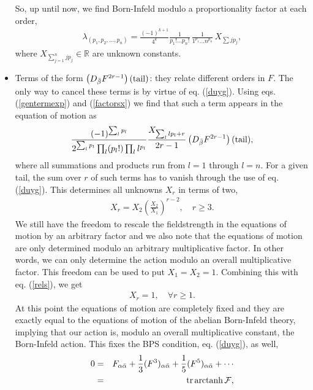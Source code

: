 \documentclass[a4paper,12pt,oneside]{article}
\def\IR{\mathbb{R}}
\newcommand{\tail}{\mbox{$({\rm tail})$}}
\begin{document}
\begin{itemize}
So, up until now, we find Born-Infeld modulo a proportionality factor at each order,
\begin{eqnarray}
\label{factorsx}
\lambda_{(p_1,p_2,\ldots,p_n)}=\frac{(-1)^{k+1}}{4^k} \frac{1}{p_1 ! \ldots p_n !} \,
                               \frac{1}{1^{p_1} \ldots n^{p_n}} \, X_{\sum j p_j},
\end{eqnarray}
where $X_{\sum_{j=1}^n j p_j}\in\IR$ are unknown constants.
\item Terms of the form $\left( D_{\bar{\beta}} F^{2r-1} \right)  \tail$: 
they relate different 
orders in $F$. The only way to cancel these terms is by virtue of eq. (\ref{duyg}). 
Using eqs. (\ref{gentermexp}) and (\ref{factorsx}) we find that such a term appears 
in the equation of motion as
\begin{eqnarray}
\frac{(-1)^{\sum_l p_l}}{2^{\sum_l p_l}
\prod_l (p_l!)\prod_l l^{p_l}}\frac{X_{\sum_l l p_l+r}}{2r-1}
\left( D_{\bar{\beta}} F^{2r-1} \right)  \tail ,
\end{eqnarray}
where all summations and products run from $l=1$ through $l=n$. For a 
given tail, the sum over $r$ of such terms has to vanish through the use
of eq. (\ref{duyg}). This determines all unknowns $X_r$ in terms of two,
\begin{eqnarray}
X_r=X_2\left(\frac{X_2}{X_1}\right)^{r-2},\quad r\geq 3.\label{rels}
\end{eqnarray}
We still have the freedom to rescale the fieldstrength in the equations of 
motion by an arbitrary factor and we also note that the equations of 
motion are only determined modulo an arbitrary multiplicative factor. In 
other words, we can only determine the action modulo an overall 
multiplicative factor. This freedom can be used to put $X_1=X_2=1$. 
Combining this with eq. (\ref{rels}), we get 
\begin{eqnarray}
X_r=1, \quad\forall r \geq 1. \label{ctfix}
\end{eqnarray}
At this point the equations of motion are completely fixed and they are 
exactly equal to the equations of motion of the abelian Born-Infeld 
theory, implying that our action is, modulo an overall multiplicative 
constant, the Born-Infeld action. This fixes the BPS condition, eq. 
(\ref{duyg}), as well,
\begin{eqnarray}
\label{pertinst}
0 & = & F_{\alpha \bar\alpha } + \frac{1}{3} (F^3)_{\alpha \bar\alpha } + 
\frac{1}{5} (F^5)_{\alpha \bar\alpha } + \cdots \nonumber\\
  & =&\mbox{tr}\, {\rm arctanh} \, {\cal F},
\end{eqnarray}

\end{itemize}
\end{document}
